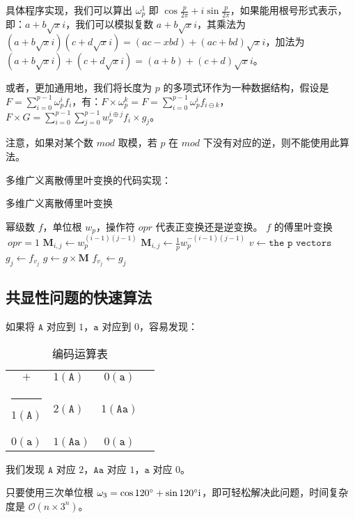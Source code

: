 \documentclass{article}
\makeatletter
\def\hlinewd#1{
\noalign{\ifnum0=`}\fi\hrule \@height #1
\futurelet\reserved@a\@xhline}
\makeatother
\begin{document}
具体程序实现，我们可以算出 $\omega_p^1$ 即 $\cos \frac{p}{2\pi} + i\sin \frac{p}{2\pi}$，如果能用根号形式表示，即：$a+b\sqrt{x}i$，我们可以模拟复数 $a+b\sqrt{x}i$，其乘法为 $(a+b\sqrt{x}i)(c+d\sqrt{x}i)=(ac-xbd)+(ac+bd)\sqrt{x}i$，加法为 $(a+b\sqrt xi)+(c+d\sqrt xi)=(a+b)+(c+d)\sqrt xi$。

或者，更加通用地，我们将长度为 $p$ 的多项式环作为一种数据结构，假设是 $F=\sum_{i=0}^{p-1} \omega_p^i f_i$，有：$F \times \omega_p^k=F=\sum_{i=0}^{p-1} \omega_p^i f_{i\ominus k}$，$F \times G=\sum_{i=0}^{p-1} \sum_{j=0}^{p-1} w_p^{i \oplus j} f_i \times g_j$。

注意，如果对某个数 $mod$ 取模，若 $p$ 在 $mod$ 下没有对应的逆，则不能使用此算法。

多维广义离散傅里叶变换的代码实现：

\begin{algorithm}
    \caption{多维广义离散傅里叶变换}
    \begin{algorithmic}[1]
        \Require 幂级数 $f$，单位根 $w_p$，操作符 $opr$ 代表正变换还是逆变换。
        \Ensure $f$ 的傅里叶变换
            \If $\ opr=1$
                \State $\textbf{M}_{i,j} \gets w^{(i-1)(j-1)}_p$
            \Else
                \State $\textbf{M}_{i,j} \gets \frac{1}{p}w^{-(i-1)(j-1)}_p$
            \EndIf
                    \State $v \gets \texttt{the p vectors}$
                        \State $g_j \gets f_{v_j}$
                    \EndFor
                    \State $g \gets g \times \textbf{M}$
                        \State $f_{v_j} \gets g_j$
                    \EndFor
                \EndFor
            \EndFor
            \State {}
        \EndFunction
    \end{algorithmic}
\end{algorithm}

\subsection{共显性问题的快速算法}

如果将 $\texttt{A}$ 对应到 $1$，$\texttt{a}$ 对应到 $0$，容易发现：

\begin{table}[htbp]
    \centering
    \caption{编码运算表}
    \begin{tabular}{cV{3}c|c}
        $+$ & $1(\texttt{A})$ & $0(\texttt{a})$\\ \hlinewd{1pt}
        $1(\texttt{A})$ & $2(\texttt{A})$ & $1(\texttt{Aa})$\\ \hline
        $0(\texttt{a})$ & $1(\texttt{Aa})$ & $0(\texttt{a})$\\
    \end{tabular}
\end{table}

我们发现 $\texttt{A}$ 对应 $2$，$\texttt{Aa}$ 对应 $1$，$\texttt{a}$ 对应 $0$。

只要使用三次单位根 $\omega_3=\cos 120^\circ + \sin 120^\circ \rm i$，即可轻松解决此问题，时间复杂度是 $\mathcal O(n \times 3^n)$。
\end{document}
